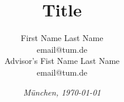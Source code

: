 %
% 
% 
%

\newcommand{\shiftedframetitle}[1]{\frametitle{\\\vspace{-2.5cm}#1}\vspace{0.5cm}}





\renewcommand{\PersonTitel}{}
\newcommand{\Datum}{\today}

\renewcommand{\PraesentationFusszeileZusatz}{| firstname.lastname@tum.de | Presentation Type / Event}

\title{Title}

\author{\vspace{2cm} First Name Last Name\\email@tum.de \\ \vspace{0.2cm} Advisor's Fist Name Last Name \\ email@tum.de}

\date[]{\textit{M\"unchen, \Datum} }




\PraesentationMasterKopfzeileDreizeiler
\PraesentationTitelseite %


